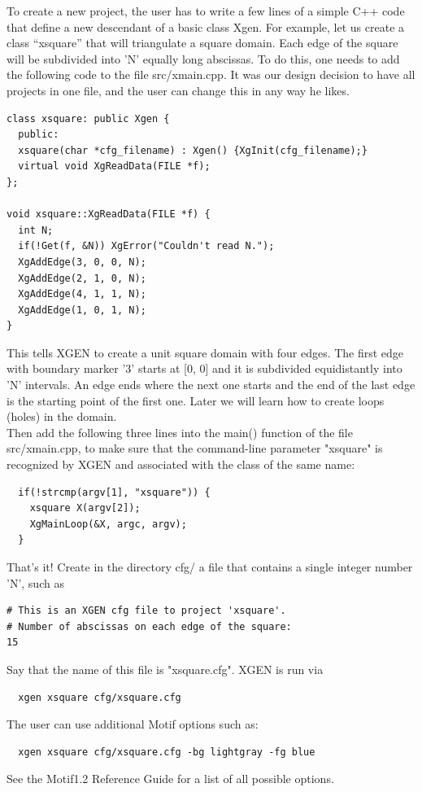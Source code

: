\documentclass[12pt]{article}
\begin{document}
  To create a new project, the user has to write 
  a few lines of a simple C++ code that define a new descendant of
  a basic class Xgen. For example, let us create a class ``xsquare''
  that will triangulate a square domain. Each edge of the square 
  will be subdivided into 'N' equally long abscissas. To do this,
  one needs to add the following code to the file src/xmain.cpp.
  It was our design decision to have all projects in one file, and
  the user can change this in any way he likes.

  \begin{verbatim}
class xsquare: public Xgen {
  public:
  xsquare(char *cfg_filename) : Xgen() {XgInit(cfg_filename);}
  virtual void XgReadData(FILE *f);
};

void xsquare::XgReadData(FILE *f) {
  int N; 
  if(!Get(f, &N)) XgError("Couldn't read N.");
  XgAddEdge(3, 0, 0, N);
  XgAddEdge(2, 1, 0, N);
  XgAddEdge(4, 1, 1, N);
  XgAddEdge(1, 0, 1, N);
}
  \end{verbatim}
This tells XGEN to create a unit square domain with four edges. The first 
  edge with boundary marker '3' starts at [0, 0] and it is subdivided 
  equidistantly into 'N' intervals. An edge ends where the next one  
  starts and the end of the last edge is the starting point of the first one.
  Later we will learn how to create loops (holes) in the domain.\\
 
  \noindent
  Then add the following three lines into the main() function of the 
  file src/xmain.cpp, to make sure that the command-line parameter
  "xsquare" is recognized by XGEN and associated with the class of
  the same name:
  \begin{verbatim}
  if(!strcmp(argv[1], "xsquare")) {
    xsquare X(argv[2]);
    XgMainLoop(&X, argc, argv);
  }
  \end{verbatim}
  That's it! Create in the directory cfg/ a file that contains a single 
  integer number 'N', such as 
  \begin{verbatim}  
# This is an XGEN cfg file to project 'xsquare'.
# Number of abscissas on each edge of the square:
15
  \end{verbatim}
  Say that the name of this file is "xsquare.cfg". XGEN is run via
  \begin{verbatim}
  xgen xsquare cfg/xsquare.cfg
  \end{verbatim}
  \noindent
  The user can use additional Motif options such as:

  \begin{verbatim}  
  xgen xsquare cfg/xsquare.cfg -bg lightgray -fg blue 
  \end{verbatim}
  See the Motif1.2 Reference Guide for a list of all possible options.\\
\end{document}
